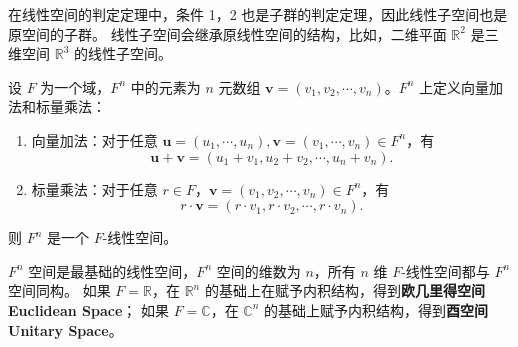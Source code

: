 \begin{note}
    在线性空间的判定定理中，条件 1，2 也是子群的判定定理，因此线性子空间也是原空间的子群。
    线性子空间会继承原线性空间的结构，比如，二维平面 $ \mathbb{R}^2 $ 是三维空间 $ \mathbb{R}^3 $ 的线性子空间。
\end{note}

\vspace{1em}

\begin{definition}[$F^n$ 空间]
    设 $F$ 为一个域，$F^n$ 中的元素为 $n$ 元数组 $\mathbf{v}=(v_1,v_2,\cdots,v_n)$。$F^n$ 上定义向量加法和标量乘法：
    \begin{enumerate}
        \item 向量加法：对于任意 $\mathbf{u}=(u_1,\cdots,u_n),\mathbf{v}=(v_1,\cdots,v_n)\in F^n$，有
        \[
            \mathbf{u}+\mathbf{v}=(u_1+v_1,u_2+v_2,\cdots,u_n+v_n).
        \]
        \item 标量乘法：对于任意 $r\in F$，$\mathbf{v}=(v_1,v_2,\cdots,v_n)\in F^n$，有
        \[
            r\cdot \mathbf{v} = (r\cdot v_1,r\cdot v_2,\cdots,r\cdot v_n).
        \]
    \end{enumerate}
    则 $F^n$ 是一个 $F$-线性空间。
    \label{def:Fn_space}
\end{definition}

\begin{note}
    $F^n$ 空间是最基础的线性空间，$F^n$ 空间的维数为 $n$，所有 $n$ 维 $F$-线性空间都与 $F^n$ 空间同构。
    如果 $F=\mathbb{R}$，在 $\mathbb{R}^n$ 的基础上在赋予内积结构，得到\textbf{欧几里得空间 Euclidean Space}；
    如果 $F=\mathbb{C}$，在 $\mathbb{C}^n$ 的基础上赋予内积结构，得到\textbf{酉空间 Unitary Space}。
\end{note}

\newpage